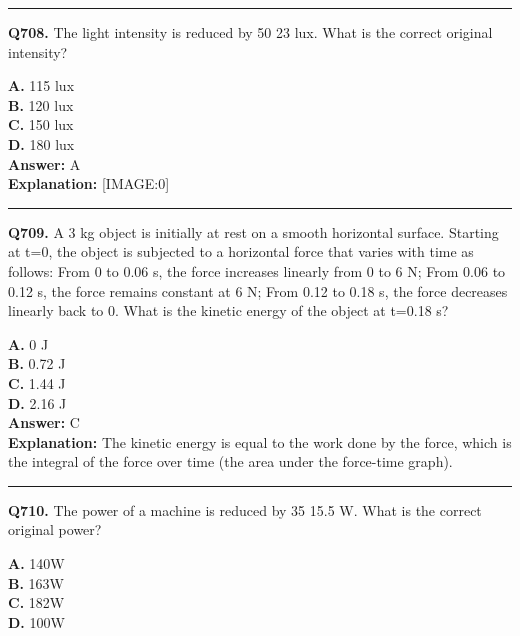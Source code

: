 \documentclass[12pt]{article}
\begin{document}
\hrule
\vspace{1em}


\noindent
\textbf{Q708.} The light intensity is reduced by 50%
23
lux. What is the correct original intensity?



\textbf{A.} 115
lux \\
\textbf{B.} 120 lux \\
\textbf{C.} 150 lux \\
\textbf{D.} 180 lux \\

\textbf{Answer:} A \\
\textbf{Explanation:} [IMAGE:0]

\hrule
\vspace{1em}


\noindent
\textbf{Q709.} A 3 kg object is initially at rest on a smooth horizontal surface. Starting at t=0, the object is subjected to a horizontal force that varies with time as follows:
From 0 to 0.06 s, the force increases linearly from 0 to 6 N;
From 0.06 to 0.12 s, the force remains constant at 6 N;
From 0.12 to 0.18 s, the force decreases linearly back to 0.
What is the kinetic energy of the object at t=0.18 s?



\textbf{A.} 0 J \\
\textbf{B.} 0.72 J \\
\textbf{C.} 1.44 J \\
\textbf{D.} 2.16 J \\

\textbf{Answer:} C \\
\textbf{Explanation:} The kinetic energy is equal to the work done by the force, which is the integral of the force over time (the area under the force-time graph).

\hrule
\vspace{1em}


\noindent
\textbf{Q710.} The power of a machine is reduced by 35%
15.5
W. What is the correct original power?



\textbf{A.} 140W \\
\textbf{B.} 163W \\
\textbf{C.} 182W \\
\textbf{D.} 100W \\
\end{document}
